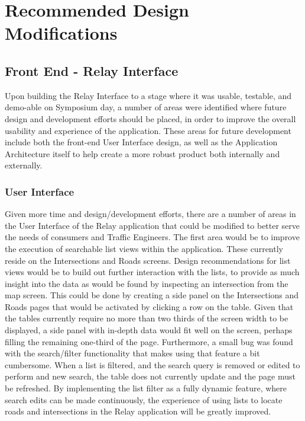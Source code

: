 \documentclass{report}
\begin{document}
\newpage
\chapter{Recommended Design Modifications}
\label{chap:improvements}

\section{Front End - Relay Interface}
Upon building the Relay Interface to a stage where it was usable, testable, and demo-able on Symposium day, a number of areas were identified where future design and development efforts should be placed, in order to improve the overall usability and experience of the application.
These areas for future development include both the front-end User Interface design, as well as the Application Architecture itself to help create a more robust product both internally and externally.

\subsection{User Interface}
Given more time and design/development efforts, there are a number of areas in the User Interface of the Relay application that could be modified to better serve the needs of consumers and Traffic Engineers.
The first area would be to improve the execution of searchable list views within the application.
These currently reside on the Intersections and Roads screens.
Design recommendations for list views would be to build out further interaction with the lists, to provide as much insight into the data as would be found by inspecting an intersection from the map screen.
This could be done by creating a side panel on the Intersections and Roads pages that would be activated by clicking a row on the table.
Given that the tables currently require no more than two thirds of the screen width to be displayed, a side panel with in-depth data would fit well on the screen, perhaps filling the remaining one-third of the page.
Furthermore, a small bug was found with the search/filter functionality that makes using that feature a bit cumbersome.
When a list is filtered, and the search query is removed or edited to perform and new search, the table does not currently update and the page must be refreshed.
By implementing the list filter as a fully dynamic feature, where search edits can be made continuously, the experience of using lists to locate roads and intersections in the Relay application will be greatly improved.
\end{document}
